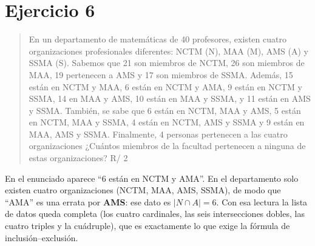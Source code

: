 \documentclass[11pt]{article}
\begin{document}
\section*{Ejercicio 6}

\begin{quote}
En un departamento de matemáticas de 40 profesores, existen cuatro organizaciones profesionales
diferentes: NCTM (N), MAA (M), AMS (A) y SSMA (S). Sabemos que 21 son miembros de NCTM, 26 son miembros
de MAA, 19 pertenecen a AMS y 17 son miembros de SSMA. Además, 15 están en NCTM y MAA, 6 están en NCTM y
AMA, 9 están en NCTM y SSMA, 14 en MAA y AMS, 10 están en MAA y SSMA, y 11 están en AMS y SSMA. También,
se sabe que 6 están en NCTM, MAA y AMS, 5 están en NCTM, MAA y SSMA, 4 están en NCTM, AMS y SSMA y 9 están
en MAA, AMS y SSMA. Finalmente, 4 personas pertenecen a las cuatro organizaciones ¿Cuántos miembros de la
facultad pertenecen a ninguna de estas organizaciones? \hfill R/ 2
\end{quote}

\begin{nota}
En el enunciado aparece ``6 están en NCTM y AMA''. En el departamento solo existen cuatro organizaciones
(NCTM, MAA, AMS, SSMA), de modo que ``AMA'' es una errata por \textbf{AMS}: ese dato es $|N\cap A|=6$.
Con esa lectura la lista de datos queda completa (los cuatro cardinales, las seis intersecciones dobles,
las cuatro triples y la cuádruple), que es exactamente lo que exige la fórmula de inclusión--exclusión.
\end{nota}
\end{document}
